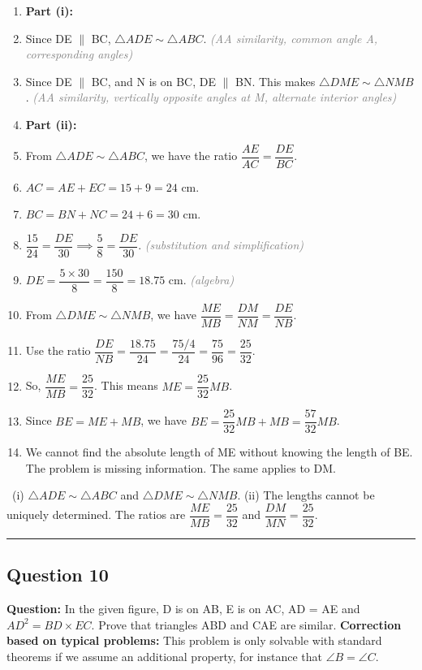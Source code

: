 \documentclass{article}
\newenvironment{steps}{%
  \begin{enumerate}[label=\textcolor{primary}{Step~\arabic*:}, leftmargin=*]
}{\end{enumerate}}
\newcommand{\dul}[1]{\uuline{#1}}
\newcommand{\reason}[1]{\hfill\textit{\textcolor{gray}{(#1)}}}
\newcommand{\solutionrule}{\par\noindent\color{accent}\rule{\linewidth}{0.6pt}\par\smallskip}
\newcommand{\finalanswer}[1]{\noindent\textbf{\textcolor{accent}{\dul{Answer:}}}~#1\solutionrule}
\begin{document}
\begin{steps}
    \item \textbf{Part (i):}
    \item Since DE $\parallel$ BC, $\triangle ADE \sim \triangle ABC$. \reason{AA similarity, common angle A, corresponding angles}
    \item Since DE $\parallel$ BC, and N is on BC, DE $\parallel$ BN. This makes $\triangle DME \sim \triangle NMB$. \reason{AA similarity, vertically opposite angles at M, alternate interior angles}
    \item \textbf{Part (ii):}
    \item From $\triangle ADE \sim \triangle ABC$, we have the ratio $\dfrac{AE}{AC} = \dfrac{DE}{BC}$.
    \item $AC = AE + EC = 15 + 9 = 24$ cm.
    \item $BC = BN + NC = 24 + 6 = 30$ cm.
    \item $\dfrac{15}{24} = \dfrac{DE}{30} \implies \dfrac{5}{8} = \dfrac{DE}{30}$. \reason{substitution and simplification}
    \item $DE = \dfrac{5 \times 30}{8} = \dfrac{150}{8} = 18.75$ cm. \reason{algebra}
    \item From $\triangle DME \sim \triangle NMB$, we have $\dfrac{ME}{MB} = \dfrac{DM}{NM} = \dfrac{DE}{NB}$.
    \item Use the ratio $\dfrac{DE}{NB} = \dfrac{18.75}{24} = \dfrac{75/4}{24} = \dfrac{75}{96} = \dfrac{25}{32}$.
    \item So, $\dfrac{ME}{MB} = \dfrac{25}{32}$. This means $ME = \dfrac{25}{32}MB$.
    \item Since $BE = ME + MB$, we have $BE = \dfrac{25}{32}MB + MB = \dfrac{57}{32}MB$.
    \item We cannot find the absolute length of ME without knowing the length of BE. The problem is missing information. The same applies to DM.
\end{steps}

\finalanswer{(i) $\triangle ADE \sim \triangle ABC$ and $\triangle DME \sim \triangle NMB$. (ii) The lengths cannot be uniquely determined. The ratios are $\dfrac{ME}{MB} = \dfrac{25}{32}$ and $\dfrac{DM}{MN} = \dfrac{25}{32}$.}

\subsection*{Question 10}
\textbf{Question:} In the given figure, D is on AB, E is on AC, AD = AE and $AD^2 = BD \times EC$. Prove that triangles ABD and CAE are similar.
\textbf{Correction based on typical problems:} This problem is only solvable with standard theorems if we assume an additional property, for instance that $\angle B = \angle C$.
\end{document}
